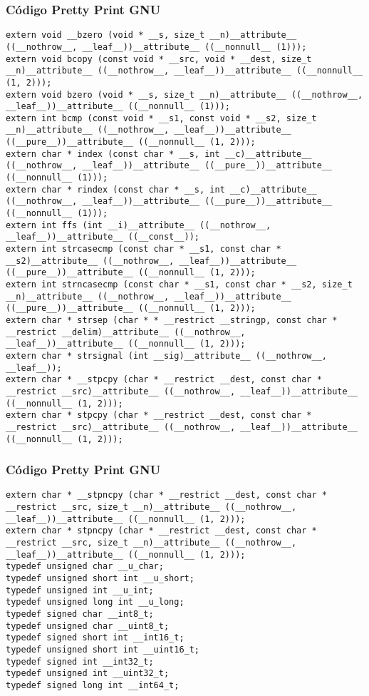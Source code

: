 \documentclass{beamer}
\begin{document}
\begin{frame}[fragile]
\frametitle{C\'odigo Pretty Print GNU}
\begin{verbatim}
extern void __bzero (void * __s, size_t __n)__attribute__ ((__nothrow__, __leaf__))__attribute__ ((__nonnull__ (1)));
extern void bcopy (const void * __src, void * __dest, size_t __n)__attribute__ ((__nothrow__, __leaf__))__attribute__ ((__nonnull__ (1, 2)));
extern void bzero (void * __s, size_t __n)__attribute__ ((__nothrow__, __leaf__))__attribute__ ((__nonnull__ (1)));
extern int bcmp (const void * __s1, const void * __s2, size_t __n)__attribute__ ((__nothrow__, __leaf__))__attribute__ ((__pure__))__attribute__ ((__nonnull__ (1, 2)));
extern char * index (const char * __s, int __c)__attribute__ ((__nothrow__, __leaf__))__attribute__ ((__pure__))__attribute__ ((__nonnull__ (1)));
extern char * rindex (const char * __s, int __c)__attribute__ ((__nothrow__, __leaf__))__attribute__ ((__pure__))__attribute__ ((__nonnull__ (1)));
extern int ffs (int __i)__attribute__ ((__nothrow__, __leaf__))__attribute__ ((__const__));
extern int strcasecmp (const char * __s1, const char * __s2)__attribute__ ((__nothrow__, __leaf__))__attribute__ ((__pure__))__attribute__ ((__nonnull__ (1, 2)));
extern int strncasecmp (const char * __s1, const char * __s2, size_t __n)__attribute__ ((__nothrow__, __leaf__))__attribute__ ((__pure__))__attribute__ ((__nonnull__ (1, 2)));
extern char * strsep (char * * __restrict __stringp, const char * __restrict __delim)__attribute__ ((__nothrow__, __leaf__))__attribute__ ((__nonnull__ (1, 2)));
extern char * strsignal (int __sig)__attribute__ ((__nothrow__, __leaf__));
extern char * __stpcpy (char * __restrict __dest, const char * __restrict __src)__attribute__ ((__nothrow__, __leaf__))__attribute__ ((__nonnull__ (1, 2)));
extern char * stpcpy (char * __restrict __dest, const char * __restrict __src)__attribute__ ((__nothrow__, __leaf__))__attribute__ ((__nonnull__ (1, 2)));
\end{verbatim}
\end{frame}
\begin{frame}[fragile]
\frametitle{C\'odigo Pretty Print GNU}
\begin{verbatim}
extern char * __stpncpy (char * __restrict __dest, const char * __restrict __src, size_t __n)__attribute__ ((__nothrow__, __leaf__))__attribute__ ((__nonnull__ (1, 2)));
extern char * stpncpy (char * __restrict __dest, const char * __restrict __src, size_t __n)__attribute__ ((__nothrow__, __leaf__))__attribute__ ((__nonnull__ (1, 2)));
typedef unsigned char __u_char;
typedef unsigned short int __u_short;
typedef unsigned int __u_int;
typedef unsigned long int __u_long;
typedef signed char __int8_t;
typedef unsigned char __uint8_t;
typedef signed short int __int16_t;
typedef unsigned short int __uint16_t;
typedef signed int __int32_t;
typedef unsigned int __uint32_t;
typedef signed long int __int64_t;
\end{verbatim}
\end{frame}
\end{document}
